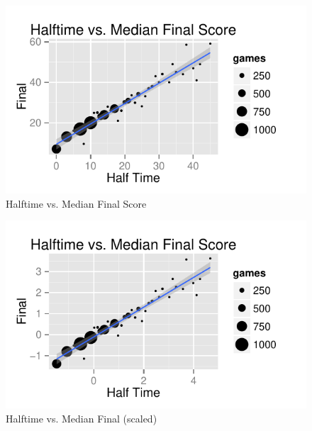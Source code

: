 \documentclass[landscape]{exam}
\begin{document}
  \begin{figure}[H]
    \centering
    \includegraphics{figures/nfl/ht_vs_median_final.pdf}
    \caption{Halftime vs. Median Final Score}
  \end{figure}

  \begin{figure}[H]
    \centering
    \includegraphics{figures/nfl/ht_vs_median_final_scaled.pdf}
    \caption{Halftime vs. Median Final (scaled)}
  \end{figure}
\end{document}
